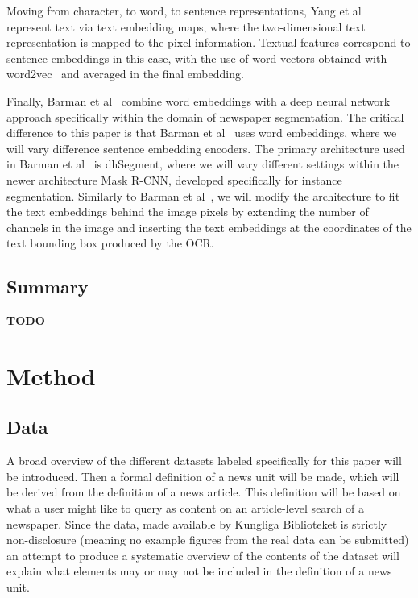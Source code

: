 \documentclass[english, bibtex]{kththesis}
\begin{document}
Moving from character, to word, to sentence representations, Yang et al~\cite{DBLP:journals/corr/YangYAKKG17} represent text via text embedding maps, where the two-dimensional text representation is mapped to the pixel information. Textual features correspond to sentence embeddings in this case, with the use of word vectors obtained with word2vec~\cite{mikolov2013} and averaged in the final embedding. 

Finally, Barman et al~\cite{jdmdh:7097} combine word embeddings with a deep neural network approach specifically within the domain of newspaper segmentation. The critical difference to this paper is that Barman et al~\cite{jdmdh:7097} uses word embeddings, where we will vary difference sentence embedding encoders. The primary architecture used in Barman et al~\cite{jdmdh:7097} is dhSegment, where we will vary different settings within the newer architecture Mask R-CNN, developed specifically for instance segmentation. Similarly to Barman et al~\cite{jdmdh:7097}, we will modify the architecture to fit the text embeddings behind the image pixels by extending the number of channels in the image and inserting the text embeddings at the coordinates of the text bounding box produced by the OCR. 

\section{Summary}

\textbf{TODO}

\clearpage


\chapter{Method}
\label{ch:method}


\section{Data}

A broad overview of the different datasets labeled specifically for this paper will be introduced. Then a formal definition of a news unit will be made, which will be derived from the definition of a news article. This definition will be based on what a user might like to query as content on an article-level search of a newspaper. Since the data, made available by Kungliga Biblioteket is strictly non-disclosure (meaning no example figures from the real data can be submitted) an attempt to produce a systematic overview of the contents of the dataset will explain what elements may or may not be included in the definition of a news unit.
\end{document}
